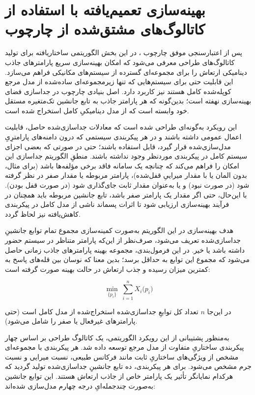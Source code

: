 
\section{بهینه‌سازی تعمیم‌یافته با استفاده از کاتالوگ‌های مشتق‌شده از چارچوب }

پس از اعتبارسنجی موفق چارچوب ، در این بخش الگوریتمی ساختاریافته برای تولید کاتالوگ‌های طراحی معرفی می‌شود که امکان بهینه‌سازی سریع پارامترهای جاذب دینامیکی ارتعاش را برای مجموعه‌ای گسترده از سیستم‌های مکانیکی فراهم می‌سازد. این قابلیت حتی برای سیستم‌هایی که تنها زیرمجموعه‌ای ساده‌شده از مدل مرجع کوپله‌شده کامل هستند نیز کاربرد دارد. اصل بنیادی چارچوب  در جداسازی فضای بهینه‌سازی نهفته است؛ بدین‌گونه که هر پارامتر جاذب به تابع جانشین تک‌متغیره مستقل خود وابسته است که از مدل دینامیکیِ کامل استخراج شده است.

این رویکرد به‌گونه‌ای طراحی شده است که معادلات جداسازی‌شده حاصل، قابلیت اعمال عمومی داشته باشند و در هر پیکربندی سیستمی که درون دامنه‌های پارامترِیِ مدل‌سازی‌شده قرار گیرد، قابل استفاده باشند؛ حتی در صورتی که بعضی اجزای سیستم کامل در پیکربندی موردنظر وجود نداشته باشند. منطقِ الگوریتم جداسازی این امکان را فراهم می‌کند که چنانچه یک سامانه فاقد برخی مؤلفه‌ها باشد (برای مثال، بدون المان  یا با مقدار میراییِ قفل‌شده)، پارامتر مربوطه یا مقدار صفر در نظر گرفته شود (در صورت نبود) و یا به‌عنوان مقدار ثابت جای‌گذاری شود (در صورت قفل بودن). با این‌حال، حتی اگر مقدار یک پارامتر صفر باشد، تابع جانشین مربوطه باید همچنان در فرآیند بهینه‌سازی ارزیابی شود تا اثرات پسماند ناشی از مدل کامل در پیکربندی کاهش‌یافته نیز لحاظ گردد.

هدف بهینه‌سازی در این الگوریتم به‌صورت کمینه‌سازی مجموع تمام توابع جانشینِ جداسازی‌شده تعریف می‌شود، صرف‌نظر از این‌که پارامتر متناظر در سیستم حضور داشته باشد یا خیر. در این فرمول‌بندی، مجموعه بهینه پارامترهای جاذب زمانی حاصل می‌شود که مجموع این توابع به حداقل برسد؛ بدین معنا که نوسان بین قله‌های پاسخ به کمترین میزان رسیده و جذب ارتعاش در حالت بهینه صورت گرفته است:

\begin{equation}
\min_{\{p_i\}} \; \sum_{i=1}^{n} X_i\bigl(p_i\bigr)
\end{equation}

در این‌جا \(n\) تعداد کل توابعِ جداسازی‌شده استخراج‌شده از مدل کامل است (حتی پارامترهای غیرفعال یا صفر را شامل می‌شود).

به‌منظور پشتیبانی از این رویکرد الگوریتمی، یک کاتالوگ طراحی بر اساس چهار پیکربندی ساختاریِ متفاوت از مدل مرجع توسعه داده شد. هر پیکربندی با مجموعه‌ای مشخص از ویژگی‌های ساختاریِ ثابت مانند فرکانس طبیعی، نسبت میرایی و نسبت جرم مشخص می‌شود. برای هر پیکربندی، ده تابع جانشینِ جداسازی‌شده تولید گردید که هرکدام نمایانگر تأثیر یک پارامتر خاص از جاذب ارتعاش هستند. این توابع جانشین به‌صورت چندجمله‌ایِ درجه چهارم مدل‌سازی شده‌اند:

